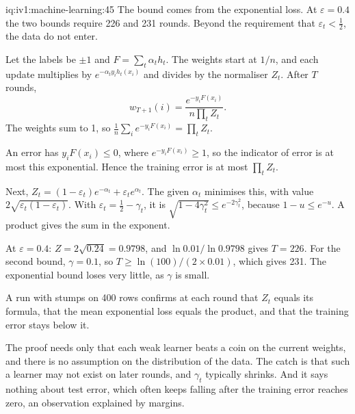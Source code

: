 \begin{solution}{iq:iv1:machine-learning:45}
The bound comes from the exponential loss. At $\varepsilon = 0.4$ the two bounds require 226 and 231 rounds. Beyond the requirement that $\varepsilon_t < \frac12$, the data do not enter.

Let the labels be $\pm 1$ and $F = \sum_t\alpha_th_t$. The weights start at $1/n$, and each update multiplies by $e^{-\alpha_ty_ih_t(x_i)}$ and divides by the normaliser $Z_t$. After $T$ rounds,
\[
w_{T + 1}(i) = \frac{e^{-y_iF(x_i)}}{n\prod_tZ_t}.
\]
The weights sum to 1, so $\frac1n\sum_ie^{-y_iF(x_i)} = \prod_tZ_t$.

An error has $y_iF(x_i) \le 0$, where $e^{-y_iF(x_i)} \ge 1$, so the indicator of error is at most this exponential. Hence the training error is at most $\prod_tZ_t$.

Next, $Z_t = (1 - \varepsilon_t)e^{-\alpha_t} + \varepsilon_te^{\alpha_t}$. The given $\alpha_t$ minimises this, with value $2\sqrt{\varepsilon_t(1 - \varepsilon_t)}$. With $\varepsilon_t = \frac12 - \gamma_t$, it is $\sqrt{1 - 4\gamma_t^2} \le e^{-2\gamma_t^2}$, because $1 - u \le e^{-u}$. A product gives the sum in the exponent.

At $\varepsilon = 0.4$: $Z = 2\sqrt{0.24} = 0.9798$, and $\ln 0.01/\ln 0.9798$ gives $T = 226$. For the second bound, $\gamma = 0.1$, so $T \ge \ln(100)/(2 \times 0.01)$, which gives 231. The exponential bound loses very little, as $\gamma$ is small.

A run with stumps on 400 rows confirms at each round that $Z_t$ equals its formula, that the mean exponential loss equals the product, and that the training error stays below it.

The proof needs only that each weak learner beats a coin on the current weights, and there is no assumption on the distribution of the data. The catch is that such a learner may not exist on later rounds, and $\gamma_t$ typically shrinks. And it says nothing about test error, which often keeps falling after the training error reaches zero, an observation explained by margins.



\end{solution}
